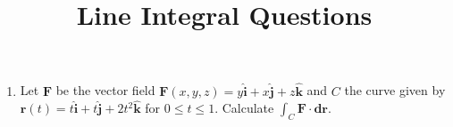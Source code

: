 \documentclass{article}%
\title{Line Integral Questions}%
\author{}%
\date{}%
\begin{document}
%
\normalsize%
\maketitle%
\begin{enumerate}%
\item%
Let $\mathbf{{F}}$ be the vector field $\mathbf{{F}}(x, y, z)=y\mathbf{\hat{i}} + x\mathbf{\hat{j}} + z\mathbf{\hat{k}}$ and $C$ the curve given by $\mathbf{r}(t)=t\mathbf{{\hat{{i}}}}+t\mathbf{{\hat{{j}}}}+2 t^{2}\mathbf{{\hat{{k}}}}$ for $0\le t\le 1$. Calculate $\displaystyle\int_C\mathbf{{F}}\cdot\mathbf{dr}$.%
\end{enumerate}%
\end{document}
